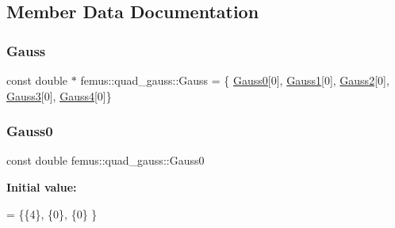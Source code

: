 \subsection{Member Data Documentation}
\mbox{\label{classfemus_1_1quad__gauss_a4035ceccc61c1acec68131dc68adb1c1}} 
\subsubsection{\texorpdfstring{Gauss}{Gauss}}
{\footnotesize\ttfamily const double $\ast$ femus\+::quad\+\_\+gauss\+::\+Gauss = \{ \mbox{\hyperlink{classfemus_1_1quad__gauss_aa348ceb37f8a61fabf45a387b449caa6}{Gauss0}}\mbox{[}0\mbox{]}, \mbox{\hyperlink{classfemus_1_1quad__gauss_a9e53cfc36f1b6a3fd3f0d232a3d10cd2}{Gauss1}}\mbox{[}0\mbox{]}, \mbox{\hyperlink{classfemus_1_1quad__gauss_af8054c34e7f8111ea4e3859ad1dd37be}{Gauss2}}\mbox{[}0\mbox{]}, \mbox{\hyperlink{classfemus_1_1quad__gauss_aff0fd84125a9e72c322ec52307acb56f}{Gauss3}}\mbox{[}0\mbox{]}, \mbox{\hyperlink{classfemus_1_1quad__gauss_a999c35e1333bb5f0c307fe4f5fc13633}{Gauss4}}\mbox{[}0\mbox{]}\}\hspace{0.3cm}{\ttfamily [static]}}

\mbox{\label{classfemus_1_1quad__gauss_aa348ceb37f8a61fabf45a387b449caa6}} 
\subsubsection{\texorpdfstring{Gauss0}{Gauss0}}
{\footnotesize\ttfamily const double femus\+::quad\+\_\+gauss\+::\+Gauss0\hspace{0.3cm}{\ttfamily [static]}}

{\bfseries Initial value\+:}
\begin{DoxyCode}
= \{\{4\},
    \{0\},
    \{0\}
  \}
\end{DoxyCode}
\mbox{\label{classfemus_1_1quad__gauss_a9e53cfc36f1b6a3fd3f0d232a3d10cd2}} 
